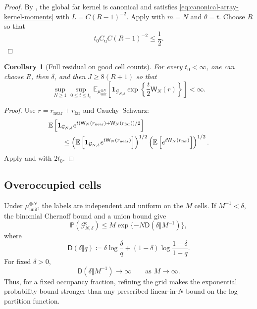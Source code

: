 \documentclass[11pt,reqno]{amsart}
\numberwithin{equation}{section}
\theoremstyle{plain}
\newtheorem{cor}[cor]{Corollary}
\theoremstyle{definition}
\newcommand{\E}{\mathbb E}
\newcommand{\Pb}{\mathbb P}
\newcommand{\one}{\mathbf 1}
\newcommand{\muunif}{\mu_{\mathrm{unif}}}
\begin{document}
\begin{proof}
By , the global far kernel is canonical and satisfies \eqref{eq:canonical-array-kernel-moments} with $L=C(R-1)^{-2}$.  Apply  with $m=N$ and $\theta=t$.  Choose $R$ so that
\begin{equation}
 t_0C_{\mathrm u}C(R-1)^{-2}\leq\frac12.
 \label{eq:R-choice-far}
\end{equation}
\end{proof}

\begin{cor}[Full residual on good cell counts]
\label{cor:full-residual-good}
For every $t_0<\infty$, one can choose $R$, then $\delta$, and then $J\geq8(R+1)$ so that
\begin{equation}
 \sup_{N\geq1}\sup_{0\leq t\leq t_0}
 \E_{\muunif^{\otimes N}}\left[
 \one_{\mathcal G_{N,\delta}}
 \exp\left\{\frac t2\mathsf W_N(r)\right\}\right]
 <\infty.
 \label{eq:full-residual-good-bound}
\end{equation}
\end{cor}

\begin{proof}
Use $r=r_{\mathrm{near}}+r_{\mathrm{far}}$ and Cauchy--Schwarz:
\begin{align}
 &\E\left[\one_{\mathcal G_{N,\delta}}
 e^{t(\mathsf W_N(r_{\mathrm{near}})+\mathsf W_N(r_{\mathrm{far}}))/2}\right]
 \notag\\
 &\qquad\leq
 \left(\E\left[\one_{\mathcal G_{N,\delta}}
 e^{t\mathsf W_N(r_{\mathrm{near}})}\right]\right)^{1/2}
 \left(\E\left[e^{t\mathsf W_N(r_{\mathrm{far}})}\right]\right)^{1/2}.
 \label{eq:near-far-cauchy-schwarz}
\end{align}
Apply  and  with $2t_0$.
\end{proof}

\subsection{Overoccupied cells}
\label{subsec:bad-occupancies}

Under $\muunif^{\otimes N}$, the labels are independent and uniform on the $M$ cells.  If $M^{-1}<\delta$, the binomial Chernoff bound and a union bound give
\begin{equation}
 \Pb(\mathcal G_{N,\delta}^{\mathsf c})
 \leq M\exp\{-N\mathsf D(\delta\Vert M^{-1})\},
 \label{eq:bad-occupancy-probability}
\end{equation}
where
\begin{equation}
 \mathsf D(\delta\Vert q)
 \coloneqq\delta\log\frac\delta q+(1-\delta)\log\frac{1-\delta}{1-q}.
 \label{eq:binary-relative-entropy}
\end{equation}
For fixed $\delta>0$,
\begin{equation}
 \mathsf D(\delta\Vert M^{-1})\longrightarrow\infty
 \qquad\text{as }M\longrightarrow\infty.
 \label{eq:occupancy-rate-divergence}
\end{equation}
Thus, for a fixed occupancy fraction, refining the grid makes the exponential probability bound stronger than any prescribed linear-in-$N$ bound on the log partition function.
\end{document}
